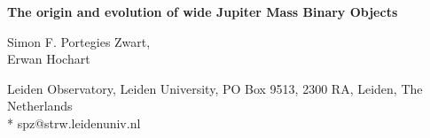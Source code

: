 \documentclass[submission,phys]{lib/SciPost}
\begin{document}
 

\begin{center}{\Large \textbf{
      The origin and evolution of wide Jupiter Mass Binary Objects
    }}
\end{center} 

\begin{center}
  Simon F. Portegies Zwart,\\
  Erwan Hochart
\end{center} 

\begin{center}
Leiden Observatory, Leiden University, PO Box 9513, 2300 RA, Leiden, The Netherlands\\
* spz@strw.leidenuniv.nl
\end{center}

\end{document}
